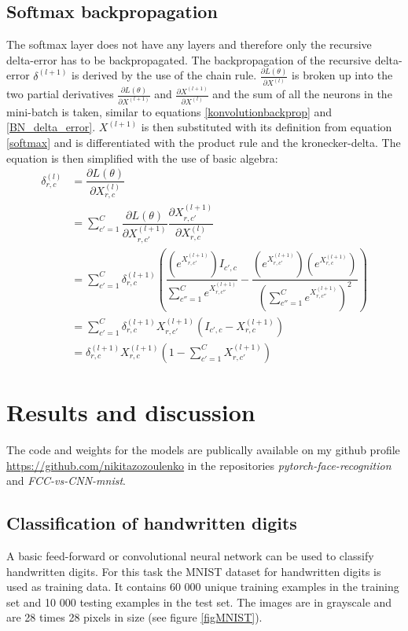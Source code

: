 \documentclass[a4paper, twoside]{article}
\newcommand*{\pd}[2]{\ensuremath{\dfrac{\partial #1}{\partial #2}}}
\newcommand*{\inpd}[2]{\ensuremath{\frac{\partial #1}{\partial #2}}}
\begin{document}
\subsection{Softmax backpropagation}
The softmax layer does not have any layers and therefore only the recursive delta-error has to be backpropagated. The backpropagation of the recursive delta-error $\delta^{(l+1)}$ is derived by the use of the chain rule. $\inpd{L(\theta)}{X^{(l)}}$ is broken up into the two partial derivatives $\inpd{L(\theta)}{X^{(l+1)}}$ and $\inpd{X^{(l+1)}}{X^{(l)}}$ and the sum of all the neurons in the mini-batch is taken, similar to equations \eqref{konvolutionbackprop} and \eqref{BN_delta_error}. $X^{(l+1)}$ is then substituted with its definition from equation \eqref{softmax} and is differentiated with the product rule and the kronecker-delta. The equation is then simplified with the use of basic algebra: \cite{cs231n} \cite{notesonbackprop} \cite{websoftmax} 
\begin{equation}
\begin{split}
\delta^{(l)}_{r,c}
		& = \pd{L(\theta)}{X^{(l)}_{r,c}} \\
		& = \sum^{C }_{c'=1} \pd{L(\theta)}{X^{(l+1)}_{r,c'}} \pd{X^{(l+1)}_{r,c'}}{X^{(l)}_{r,c}} \\
		& = \sum^{C }_{c'=1} \delta^{(l+1)}_{r,c} \left(  \dfrac{(e^{X^{(l+1)}_{r,c'}})I_{c',c}}{\sum^{C }_{c''=1}e^{X^{(l+1)}_{r,c''}}} - \dfrac{(e^{X^{(l+1)}_{r,c'}})(e^{X^{(l+1)}_{r,c}})}{(\sum^{C }_{c''=1}e^{X^{(l+1)}_{r,c''}})^2} \right) \\
		& = \sum^{C }_{c'=1}  \delta^{(l+1)}_{r,c} X^{(l+1)}_{r,c'}(I_{c',c}-X^{(l+1)}_{r,c}) \\
		& = \delta^{(l+1)}_{r,c} X^{(l+1)}_{r,c} \left( 1-\sum^{C }_{c'=1} X^{(l+1)}_{r,c'} \right)
\end{split}
\end{equation}

\section{Results and discussion}
The code and weights for the models are publically available on my github profile \url{https://github.com/nikitazozoulenko} in the repositories \textit{pytorch-face-recognition} and \textit{FCC-vs-CNN-mnist}.

\subsection{Classification of handwritten digits}
A basic feed-forward or convolutional neural network can be used to classify handwritten digits. For this task the MNIST dataset for handwritten digits is used as training data. It contains 60 000 unique training examples in the training set and 10 000 testing examples in the test set. The images are in grayscale and are 28 times 28 pixels in size (see figure \ref{figMNIST}). \cite{MNIST}
\end{document}

